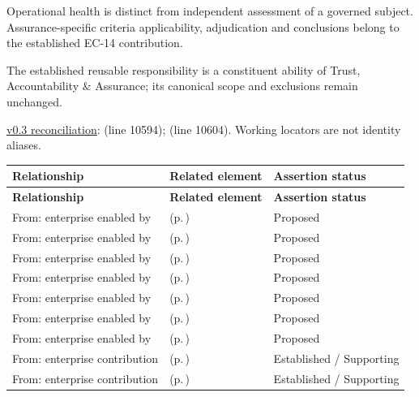
Operational health is distinct from independent assessment of a governed subject. Assurance-specific criteria applicability, adjudication and conclusions belong to the established EC-14 contribution.



The established reusable responsibility is a constituent ability of Trust, Accountability \& Assurance; its canonical scope and exclusions remain unchanged.


\hyperref[model:reconciliation]{v0.3 reconciliation}: \texttt{} (line 10594); \texttt{} (line 10604). Working locators are not identity aliases.
\begingroup\small\setlength{\TableWidth}{\dimexpr\linewidth-6\tabcolsep-4\arrayrulewidth\relax}
\begin{longtable}{|>{\raggedright\arraybackslash}p{0.27\TableWidth}|>{\raggedright\arraybackslash}p{0.48\TableWidth}|>{\raggedright\arraybackslash}p{0.25\TableWidth}|}
\hline\rowcolor{TableHead}\textbf{Relationship} & \textbf{Related element} & \textbf{Assertion status}\\\hline\endfirsthead
\hline\rowcolor{TableHead}\textbf{Relationship} & \textbf{Related element} & \textbf{Assertion status}\\\hline\endhead
\hline\endfoot
From: enterprise enabled by & \nameref{cap:bec-health-information-exchange} (p.\,\pageref{cap:bec-health-information-exchange}) & Proposed\\\hline
From: enterprise enabled by & \nameref{cap:bec-clinical-communication-administration} (p.\,\pageref{cap:bec-clinical-communication-administration}) & Proposed\\\hline
From: enterprise enabled by & \nameref{cap:bec-population-health-notification-enablement} (p.\,\pageref{cap:bec-population-health-notification-enablement}) & Proposed\\\hline
From: enterprise enabled by & \nameref{cap:bec-work-allocation-dispatch} (p.\,\pageref{cap:bec-work-allocation-dispatch}) & Proposed\\\hline
From: enterprise enabled by & \nameref{cap:bec-patient-transport} (p.\,\pageref{cap:bec-patient-transport}) & Proposed\\\hline
From: enterprise enabled by & \nameref{cap:bec-clinical-logistics-coordination} (p.\,\pageref{cap:bec-clinical-logistics-coordination}) & Proposed\\\hline
From: enterprise enabled by & \nameref{cap:bec-discharge-management} (p.\,\pageref{cap:bec-discharge-management}) & Proposed\\\hline
From: enterprise contribution & \nameref{cap:bec-assurance-design} (p.\,\pageref{cap:bec-assurance-design}) & Established / Supporting\\\hline
From: enterprise contribution & \nameref{cap:bec-assurance-criteria-management} (p.\,\pageref{cap:bec-assurance-criteria-management}) & Established / Supporting\\\hline
\end{longtable}\endgroup

